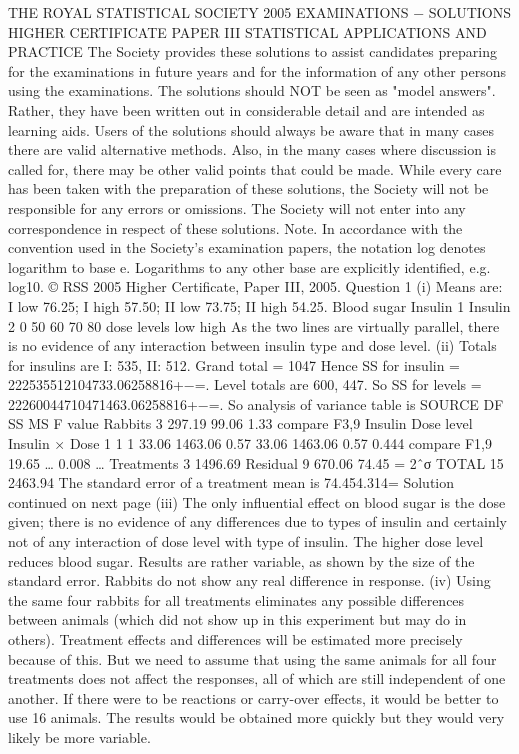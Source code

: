 THE ROYAL STATISTICAL SOCIETY
2005 EXAMINATIONS − SOLUTIONS
HIGHER CERTIFICATE
PAPER III
STATISTICAL APPLICATIONS AND PRACTICE
The Society provides these solutions to assist candidates preparing for the examinations in future years and for the information of any other persons using the examinations.
The solutions should NOT be seen as "model answers". Rather, they have been written out in considerable detail and are intended as learning aids.
Users of the solutions should always be aware that in many cases there are valid alternative methods. Also, in the many cases where discussion is called for, there may be other valid points that could be made.
While every care has been taken with the preparation of these solutions, the Society will not be responsible for any errors or omissions.
The Society will not enter into any correspondence in respect of these solutions.
Note. In accordance with the convention used in the Society's examination papers, the notation log denotes logarithm to base e. Logarithms to any other base are explicitly identified, e.g. log10.
© RSS 2005
Higher Certificate, Paper III, 2005. Question 1
(i) Means are: I low 76.25; I high 57.50; II low 73.75; II high 54.25.
Blood
sugar
Insulin 1
Insulin 2
0
50
60
70
80
dose levels
low
high
As the two lines are virtually parallel, there is no evidence of any interaction between insulin type and dose level.
(ii) Totals for insulins are I: 535, II: 512. Grand total = 1047
Hence SS for insulin = 222535512104733.06258816+−=.
Level totals are 600, 447. So SS for levels = 22260044710471463.06258816+−=.
So analysis of variance table is
SOURCE
DF
SS
MS
F value
Rabbits
3
297.19
99.06
1.33 compare F3,9
Insulin
Dose level
Insulin × Dose
1
1
1
33.06
1463.06
0.57
33.06
1463.06
0.57
0.444 compare F1,9
19.65 …
0.008 …
Treatments
3
1496.69
Residual
9
670.06
74.45
= 2ˆσ
TOTAL
15
2463.94
The standard error of a treatment mean is 74.454.314=
Solution continued on next page
(iii) The only influential effect on blood sugar is the dose given; there is no evidence of any differences due to types of insulin and certainly not of any interaction of dose level with type of insulin. The higher dose level reduces blood sugar. Results are rather variable, as shown by the size of the standard error. Rabbits do not show any real difference in response.
(iv) Using the same four rabbits for all treatments eliminates any possible differences between animals (which did not show up in this experiment but may do in others). Treatment effects and differences will be estimated more precisely because of this. But we need to assume that using the same animals for all four treatments does not affect the responses, all of which are still independent of one another. If there were to be reactions or carry-over effects, it would be better to use 16 animals. The results would be obtained more quickly but they would very likely be more variable.
